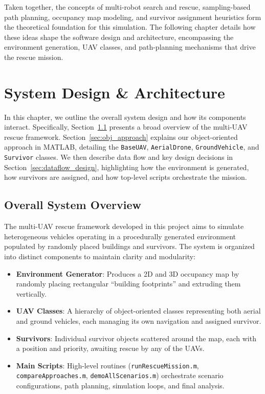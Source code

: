 \documentclass[12pt,a4paper]{report}
\begin{document}
\bigskip

\noindent Taken together, the concepts of multi-robot search and rescue, sampling-based path planning,
occupancy map modeling, and survivor assignment heuristics form the theoretical foundation
for this simulation. The following chapter details how these ideas shape the software design
and architecture, encompassing the environment generation, UAV classes, and path-planning
mechanisms that drive the rescue mission.

\chapter{System Design \& Architecture}
\label{cha:system_design}
In this chapter, we outline the overall system design and how its components interact. 
Specifically, Section~\ref{sec:system_overview} presents a broad overview of the multi-UAV 
rescue framework. Section~\ref{sec:obj_approach} explains our object-oriented approach in 
MATLAB, detailing the \texttt{BaseUAV}, \texttt{AerialDrone}, \texttt{GroundVehicle}, and 
\texttt{Survivor} classes. We then describe data flow and key design decisions in 
Section~\ref{sec:dataflow_design}, highlighting how the environment is generated, how 
survivors are assigned, and how top-level scripts orchestrate the mission.

\section{Overall System Overview}
\label{sec:system_overview}
The multi-UAV rescue framework developed in this project aims to simulate heterogeneous vehicles 
operating in a procedurally generated environment populated by randomly placed buildings and 
survivors. The system is organized into distinct components to maintain clarity and modularity:

\begin{itemize}
    \item \textbf{Environment Generator}:
          Produces a 2D and 3D occupancy map by randomly placing rectangular “building footprints” 
          and extruding them vertically.
    \item \textbf{UAV Classes}:
          A hierarchy of object-oriented classes representing both aerial and ground vehicles, 
          each managing its own navigation and assigned survivor.
    \item \textbf{Survivors}:
          Individual survivor objects scattered around the map, each with a position and priority, 
          awaiting rescue by any of the UAVs.
    \item \textbf{Main Scripts}:
          High-level routines (\texttt{runRescueMission.m}, \texttt{compareApproaches.m}, 
          \texttt{demoAllScenarios.m}) orchestrate scenario configurations, path planning, 
          simulation loops, and final analysis.
\end{itemize}
\end{document}
